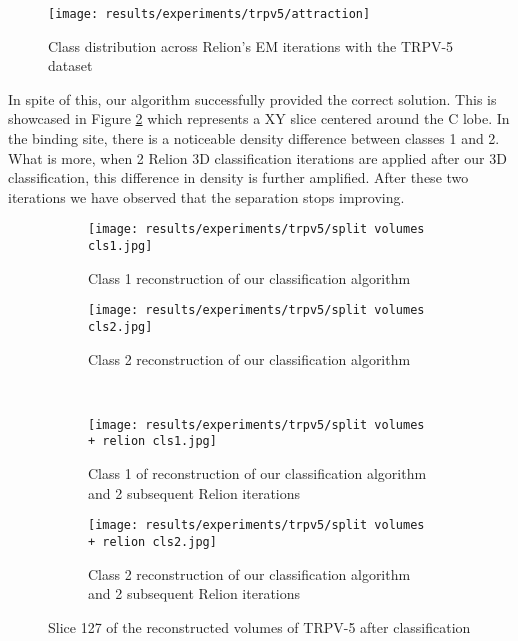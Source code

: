 \documentclass[../main.tex]{subfiles}
\begin{document}
\begin{figure}[hbp]
    \centering
    \texttt{[image: results/experiments/trpv5/attraction]}
    \caption{Class distribution across Relion's EM iterations with the TRPV-5 dataset}
    \label{fig:5.2:trpv_attraction}
\end{figure}

In spite of this, our algorithm successfully provided the correct solution. This is showcased in Figure \ref{fig:5.2:trpv5_split_volumes} which represents a XY slice centered around the C lobe. In the binding site, there is a noticeable density difference between classes 1 and 2. What is more, when 2 Relion 3D classification iterations are applied after our 3D classification, this difference in density is further amplified. After these two iterations we have observed that the separation stops improving. 

\begin{figure}[hbp]
    \centering
    \begin{subfigure}[b]{0.33\textwidth}
         \centering
         \texttt{[image: results/experiments/trpv5/split volumes cls1.jpg]}
         \caption{Class 1 reconstruction of our classification algorithm}
    \end{subfigure}
    \hspace{2em}
    \begin{subfigure}[b]{0.33\textwidth}
         \centering
         \texttt{[image: results/experiments/trpv5/split volumes cls2.jpg]}
         \caption{Class 2 reconstruction of our classification algorithm}
    \end{subfigure}\\
    \vspace{2em}
    \begin{subfigure}[b]{0.33\textwidth}
         \centering
         \texttt{[image: results/experiments/trpv5/split volumes + relion cls1.jpg]}
         \caption{Class 1 of reconstruction of our classification algorithm and 2 subsequent Relion iterations}
    \end{subfigure}
    \hspace{2em}
    \begin{subfigure}[b]{0.33\textwidth}
         \centering
         \texttt{[image: results/experiments/trpv5/split volumes + relion cls2.jpg]}
         \caption{Class 2 reconstruction of our classification algorithm and 2 subsequent Relion iterations}
    \end{subfigure}
    \caption{Slice 127 of the reconstructed volumes of TRPV-5 after classification}
    \label{fig:5.2:trpv5_split_volumes}
\end{figure}
\end{document}
